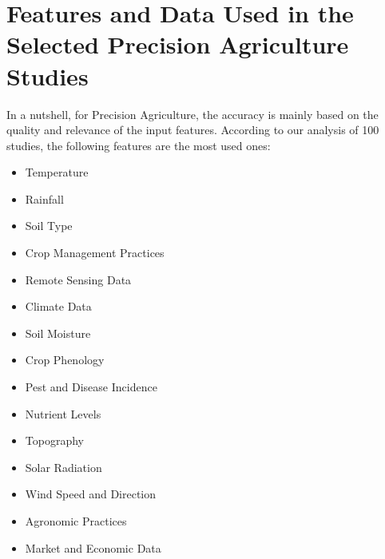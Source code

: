 \documentclass[conference]{IEEEtran}
\begin{document}
\section{Features and Data Used in the Selected Precision Agriculture Studies}

In a nutshell, for Precision Agriculture, the accuracy is mainly based on the quality and relevance of the input features. According to our analysis of 100 studies, the following features are the most used ones:

\begin{itemize}
\item Temperature
\item Rainfall
\item Soil Type
\item Crop Management Practices
\item Remote Sensing Data
\item Climate Data
\item Soil Moisture
\item Crop Phenology
\item Pest and Disease Incidence
\item Nutrient Levels
\item Topography
\item Solar Radiation
\item Wind Speed and Direction
\item Agronomic Practices
\item Market and Economic Data
\end{itemize}
\end{document}

